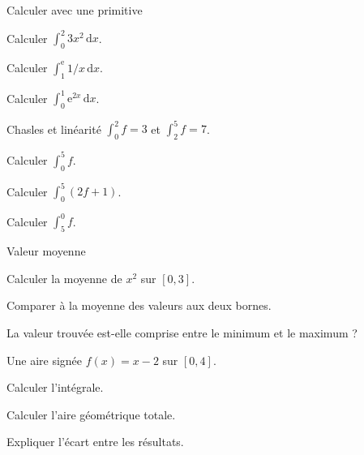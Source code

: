 \exercices
{}
\begingroup\renewcommand{\otBesoinPlace}[1]{}\begin{minipage}{\linewidth}
\begin{exercice}[1]{Calculer avec une primitive}

\begin{questions}
\item Calculer $\int_0^2 3x^2\,\mathrm dx$.
\item Calculer $\int_1^{\mathrm e}1/x\,\mathrm dx$.
\item Calculer $\int_0^1\mathrm e^{2x}\,\mathrm dx$.
\end{questions}
\end{exercice}
\begin{exercice}[1]{Chasles et linéarité}
$\int_0^2f=3$ et $\int_2^5f=7$.
\begin{questions}
\item Calculer $\int_0^5f$.
\item Calculer $\int_0^5(2f+1)$.
\item Calculer $\int_5^0f$.
\end{questions}
\end{exercice}
\begin{exercice}[1]{Valeur moyenne}

\begin{questions}
\item Calculer la moyenne de $x^2$ sur $[0,3]$.
\item Comparer à la moyenne des valeurs aux deux bornes.
\item La valeur trouvée est-elle comprise entre le minimum et le maximum ?
\end{questions}
\end{exercice}
\begin{exercice}[1]{Une aire signée}
$f(x)=x-2$ sur $[0,4]$.
\begin{questions}
\item Calculer l’intégrale.
\item Calculer l’aire géométrique totale.
\item Expliquer l’écart entre les résultats.
\end{questions}
\end{exercice}
\end{minipage}\endgroup
\clearpage
{}
